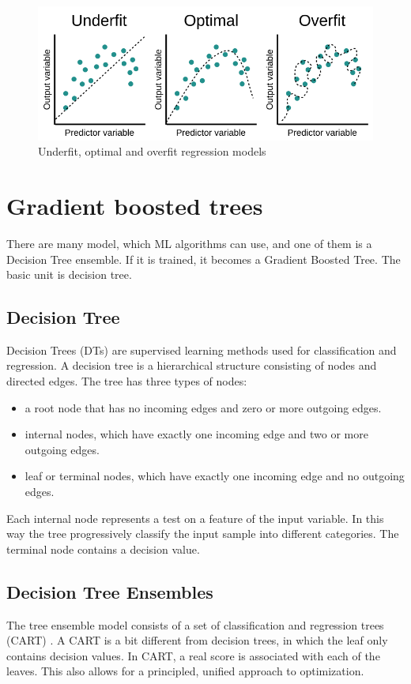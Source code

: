 \documentclass[a4paper, oneside, 11pt, openright]{book}
\begin{document}
			\begin{figure}[h!]
				\centering
				\includegraphics[width=.7\linewidth]{tesi_images/overfitting.png} 
				\caption{Underfit, optimal and overfit regression models} 
				\label{fig:Overfitting}
			\end{figure}
			
			
		
		\section{Gradient boosted trees}
		There are many model, which ML algorithms can use, and one of them is a
		Decision Tree ensemble. If it is trained, it becomes a Gradient Boosted Tree. The basic unit is decision tree.
			\subsection{Decision Tree}
			Decision Trees (DTs) \cite{Decision Tree} are supervised learning methods used for classification and regression. A decision tree is a hierarchical structure consisting of nodes and directed edges. The tree has three types of nodes:
			\begin{itemize}
				\item a root node that has no incoming edges and zero or more outgoing edges.
				\item internal nodes, which have exactly one incoming edge and two or more outgoing edges.
				\item leaf or terminal nodes, which have exactly one incoming edge and no outgoing edges.
			\end{itemize}
			
			Each internal node represents a test on a feature of the input variable. In this way the tree progressively classify the input sample into different categories. The terminal node contains a decision value.
			
			
			\subsection{Decision Tree Ensembles}
			The tree ensemble model consists of a set of classification and regression trees (CART) \cite{GBT}. A CART is a bit different from decision trees, in which the leaf only contains decision values. In CART, a real score is associated with each of the leaves. This also allows for a principled, unified approach to optimization.
			
\end{document}
